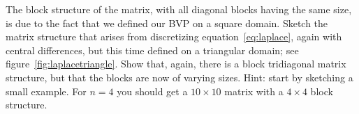   The block structure of the matrix, with all diagonal blocks having
  the same size, is due to the fact that we defined our \ac{BVP} on a
  square domain. Sketch the matrix structure that arises from
  discretizing equation~\eqref{eq:laplace}, again with central
  differences, but this time defined on a triangular domain; see
  figure~\ref{fig:laplacetriangle}. Show that, again, there is a block
  tridiagonal matrix structure, but that the blocks are now of varying
  sizes. Hint: start by sketching a small example. For $n=4$ you
  should get a $10\times 10$ matrix with a $4\times 4$ block structure.
